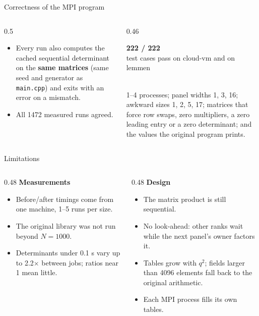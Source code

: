 \documentclass[aspectratio=169,11pt]{beamer}
\newcommand{\stat}[2]{%
  \begin{minipage}[t]{\linewidth}\centering
    {\Huge\bfseries\color{accent}#1}\\[0.3em]
    {\small\color{muted}#2}
  \end{minipage}}
\begin{document}
\begin{frame}{Correctness of the MPI program}
  \begin{columns}[T]
    \begin{column}{0.5\textwidth}
      \begin{itemize}
        \item Every run also computes the cached sequential determinant on the
              \textbf{same matrices} (same seed and generator as \texttt{main.cpp})
              and exits with an error on a mismatch.
        \item All 1472 measured runs agreed.
      \end{itemize}
    \end{column}
    \begin{column}{0.46\textwidth}
      \stat{222 / 222}{test cases pass on cloud-vm and on lemmen}
      \\[0.8em]
      {\small 1--4 processes; panel widths 1, 3, 16; awkward sizes 1, 2, 5, 17;
       matrices that force row swaps, zero multipliers, a zero leading entry or a
       zero determinant; and the values the original program prints.}
    \end{column}
  \end{columns}
\end{frame}

\begin{frame}{Limitations}
  \begin{columns}[T]
    \begin{column}{0.48\textwidth}
      \textbf{Measurements}
      \begin{itemize}\small
        \item Before/after timings come from one machine, 1--5 runs per size.
        \item The original library was not run beyond $N=1000$.
        \item Determinants under 0.1 s vary up to 2.2$\times$ between jobs;
              ratios near 1 mean little.
      \end{itemize}
    \end{column}
    \begin{column}{0.48\textwidth}
      \textbf{Design}
      \begin{itemize}\small
        \item The matrix product is still sequential.
        \item No look-ahead: other ranks wait while the next panel's owner factors it.
        \item Tables grow with $q^2$; fields larger than 4096 elements fall back to
              the original arithmetic.
        \item Each MPI process fills its own tables.
      \end{itemize}
    \end{column}
  \end{columns}
\end{frame}
\end{document}
